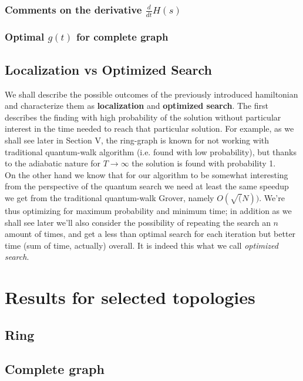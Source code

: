 \documentclass[aps,pra,reprint]{revtex4-2}
\begin{document}
\subsubsection{Comments on the derivative $\frac{d}{dt}H(s)$}
\subsubsection{Optimal $g(t)$ for complete graph}

\subsection{Localization vs Optimized Search}
We shall describe the possible outcomes of the previously introduced hamiltonian and characterize them as \textbf{localization} and \textbf{optimized search}. The first describes the finding with high probability of the solution without particular interest in the time needed to reach that particular solution. For example, as we shall see later in Section V, the ring-graph is known for not working with traditional quantum-walk algorithm (i.e. found with low probability), but thanks to the adiabatic nature for $T \to \infty$ the solution is found with probability 1. \\

On the other hand we know that for our algorithm to be somewhat interesting from the perspective of the quantum search we need at least the same speedup we get from the traditional quantum-walk Grover, namely $O(\sqrt(N))$. We're thus optimizing for maximum probability and minimum time; in addition as we shall see later we'll also consider the possibility of repeating the search an $n$ amount of times, and get a less than optimal search for each iteration but better time (sum of time, actually) overall. It is indeed this what we call \textit{optimized search}.


\section{Results for selected topologies}
\subsection{Ring}
\subsection{Complete graph}
\end{document}

